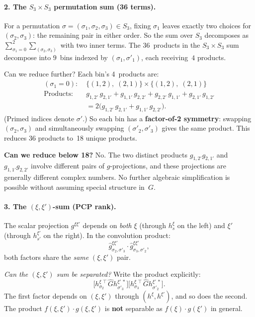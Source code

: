 \paragraph{2. The $S_3 \times S_3$ permutation sum (36 terms).}

For a permutation $\sigma = (\sigma_1, \sigma_2, \sigma_3) \in S_3$,
fixing $\sigma_1$ leaves exactly two choices for $(\sigma_2, \sigma_3)$:
the remaining pair in either order.  So the sum over $S_3$ decomposes
as $\sum_{\sigma_1=0}^{2} \sum_{(\sigma_2,\sigma_3)}$ with two inner
terms.  The $36$~products in the $S_3 \times S_3$ sum decompose into
$9$~bins indexed by $(\sigma_1, \sigma'_1)$, each receiving~$4$
products.

Can we reduce further?  Each bin's 4~products are:
\begin{align*}
  (\sigma_1{=}0):\; &
  \bigl\{(1,2),\;(2,1)\bigr\} \times
  \bigl\{(1,2),\;(2,1)\bigr\} \\[2pt]
  \text{Products:}\quad &
  g_{1,2'}\,g_{2,1'} + g_{1,1'}\,g_{2,2'}
  + g_{2,2'}\,g_{1,1'} + g_{2,1'}\,g_{1,2'} \\
  &= 2\bigl(g_{1,2'}\,g_{2,1'} + g_{1,1'}\,g_{2,2'}\bigr).
\end{align*}
(Primed indices denote $\sigma'$.)
So each bin has a \textbf{factor-of-2 symmetry}: swapping $(\sigma_2,\sigma_3)$
and simultaneously swapping $(\sigma'_2,\sigma'_3)$ gives the same product.
This reduces 36 products to~18 unique products.

\textbf{Can we reduce below 18?}
No.  The two distinct products
$g_{1,2'}g_{2,1'}$ and $g_{1,1'}g_{2,2'}$ involve different pairs
of $g$-projections, and these projections are generally different
complex numbers.  No further algebraic simplification is possible
without assuming special structure in~$G$.


\paragraph{3. The $(\xi, \xi')$-sum (PCP rank).}

The scalar projection $g^{\xi\xi'}$ depends on \emph{both}
$\xi$ (through $h_s^\xi$ on the left) and $\xi'$ (through
$h_{s'}^{\xi'}$ on the right).  In the convolution product:
\begin{equation}
  \hat{g}_{\sigma_2,\sigma'_3}^{\xi\xi'} \cdot
  \hat{g}_{\sigma_3,\sigma'_2}^{\xi\xi'},
\end{equation}
both factors share the \emph{same} $(\xi, \xi')$ pair.

\emph{Can the $(\xi,\xi')$ sum be separated?}
Write the product explicitly:
\[
  \bigl[h_{\sigma_2}^{\xi\,\intercal} \hat{G} h_{\sigma'_3}^{\xi'\,*}\bigr]
  \bigl[h_{\sigma_3}^{\xi\,\intercal} \hat{G} h_{\sigma'_2}^{\xi'\,*}\bigr].
\]
The first factor depends on $(\xi, \xi')$ through $(h^{\xi}, h^{\xi'})$,
and so does the second.  The product $f(\xi,\xi')\cdot g(\xi,\xi')$ is
\textbf{not} separable as $f(\xi)\cdot g(\xi')$ in general.

